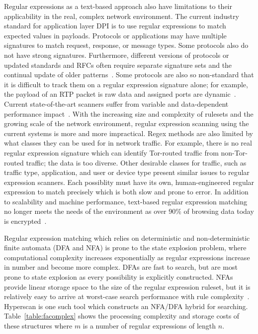 Regular expressions as a text-based approach also have limitations to their applicability in the real, complex network environment. The current industry standard for application layer DPI is to use regular expressions to match expected values in payloads. Protocols or applications may have multiple signatures to match request, response, or message types. Some protocols also do not have strong signatures. Furthermore, different versions of protocols or updated standards and RFCs often require separate signature sets and the continual update of older patterns~\cite{rexactor}. Some protocols are also so non-standard that it is difficult to track them on a regular expression signature alone; for example, the payload of an RTP packet is raw data and assigned ports are dynamic~\cite{rfc3550}. Current state-of-the-art scanners suffer from variable and data-dependent performance impact~\cite{deepmatch}. With the increasing size and complexity of rulesets and the growing scale of the network environment, regular expression scanning using the current systems is more and more impractical. Regex methods are also limited by what classes they can be used for in network traffic. For example, there is no real regular expression signature which can identify Tor-routed traffic from non-Tor-routed traffic; the data is too diverse. Other desirable classes for traffic, such as traffic type, application, and user or device type present similar issues to regular expression scanners. Each possiblity must have its own, human-engineered regular expression to match precisely which is both slow and prone to error. In addition to scalability and machine performance, text-based regular expression matching no longer meets the needs of the environment as over 90\% of browsing data today is encrypted~\cite{google}.

Regular expression matching which relies on deterministic and non-deterministic finite automata (DFA and NFA) is prone to the state explosion problem, where computational complexity increases exponentially as regular expressions increase in number and  become more complex. DFAs are fast to search, but are most prone to state explosion as every possibility is explicitly constructed. NFAs provide linear storage space to the size of the regular expression ruleset, but it is relatively easy to arrive at worst-case search performance with rule complexity~\cite{alpinepalm}. Hyperscan is one such tool which constructs an NFA/DFA hybrid for searching. Table~\ref{table:facomplex} shows the processing complexity and storage costs of these structures where $m$ is a number of regular expressions of length $n$.

